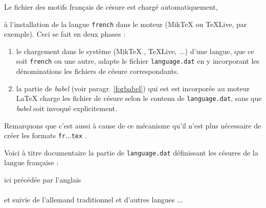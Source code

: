 \documentclass[a4paper,12pt,openright]{article}
\begin{document}
 Le fichier des motifs français de césure est chargé automatiquement,\begin{MAJ}
à l'installation de la langue \texttt{french} dans le moteur (Mik\TeX{} ou \TeX Live, par exemple).
Ceci se fait en deux phases :
\begin{enumerate}
\item le chargement dans le système (Mik\TeX{} , \TeX Live, ...) d'une langue, que ce soit 
\texttt{french} ou une autre, adapte le fichier \texttt{language.dat} en y incorporant
les dénominations les fichiers de césure correspondants.
\item la partie de \textit{ babel} (voir paragr. \ref{forbabel}) qui est est incorporée
au moteur {\LaTeX} charge les fichier de césure selon le contenu de \texttt{language.dat},
sans que \textit{ babel} soit invoqué explicitement.
\end{enumerate}
Remarquons que c'est aussi à cause de ce mécanisme qu'il n'est plus 
nécessaire de créer les formats \texttt{fr}...\texttt{tex} .
\end{MAJ}
Voici à titre documentaire la partie de \texttt{language.dat} définissant les césures de la langue française :\\[0.5ex]
\begin{minipage}{12cm}
ici précédée par l'anglais \\[0.5ex]
\\[1ex]
et suivie de l'allemand traditionnel et d'autres langues ...
\end{minipage}
\indpos
\end{document}
